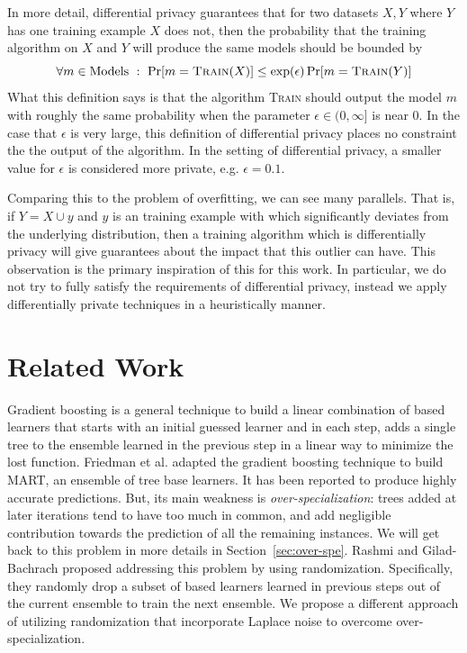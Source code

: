 \documentclass{article} %
\begin{document}
In more detail, differential privacy guarantees that for two datasets $X,Y$ where $Y$ has one training example $X$ does not, then the probability that the training algorithm on $X$ and $Y$ will produce the same models should be bounded by
$$
	\forall m \in\mbox{Models} \ : \ \Pr[m = \textsc{Train}(X)] \leq \exp(\epsilon) \Pr[m= \textsc{Train}(Y)]
$$
What this definition says is that the algorithm \textsc{Train} should output the model $m$ with roughly the same probability when the parameter $\epsilon\in (0,\infty]$ is near $0$. In the case that $\epsilon$ is very large, this definition of differential privacy places no constraint the the output of the algorithm. In the setting of differential privacy, a smaller value for $\epsilon$ is considered more private, e.g. $\epsilon=0.1$. 

Comparing this to the problem of overfitting, we can see many parallels. That is, if $Y = X \cup {y}$ and $y$ is an training example with which significantly deviates from the underlying distribution, then a training algorithm which is differentially privacy will give guarantees about the impact that this outlier can have. This observation is the primary inspiration of this for this work. In particular, we do not try to fully satisfy the requirements of differential privacy, instead we apply differentially private techniques in a heuristically manner.

\section{Related Work}    
 
 Gradient boosting is a general technique to build a linear combination of based learners that starts with an initial guessed learner and in each step, adds a single tree to the ensemble learned in the previous step in a linear way to minimize the lost function.  Friedman et al.\cite{mart} adapted the gradient boosting technique to build MART, an ensemble of tree base learners. It has been reported\cite{Caruana06anempirical} to produce highly accurate predictions. But, its main weakness is \textit{over-specialization}:  trees added at later iterations tend to have too much in common, and add negligible contribution towards the prediction of all the remaining instances. We will get back to this problem in more details in Section~\ref{sec:over-spe}. Rashmi and Gilad-Bachrach proposed addressing this problem by using randomization. Specifically, they randomly drop a subset of based learners learned in previous steps out of the current ensemble to train the next ensemble. We propose a different approach of utilizing randomization that incorporate Laplace noise to overcome over-specialization.
 
\end{document}
